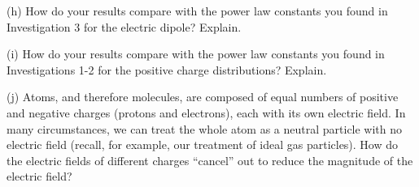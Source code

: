 (h) How do your results compare with the power law constants you found
in Investigation 3 for the electric dipole? Explain.\vspace{15mm}

(i) How do your results compare with the power law constants you found
in Investigations 1-2 for the positive charge distributions? Explain.\vspace{15mm}

(j) Atoms, and therefore molecules, are composed of equal numbers of positive
and negative charges (protons and electrons), each with its own electric
field. In many circumstances, we can treat the whole atom as a neutral
particle with no electric field (recall, for example, our treatment
of ideal gas particles). How do the electric fields of different charges
{}``cancel'' out to reduce the magnitude of the electric field?\vspace{15mm}

